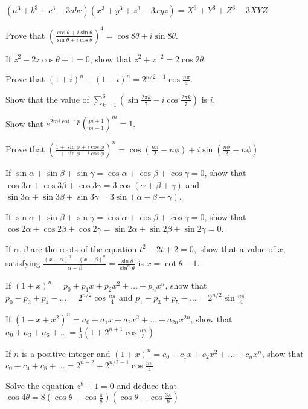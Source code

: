   \item $(a^3 + b^3 + c^3 - 3abc)(x^3 + y^3 + z^3 - 3xyz) = X^3 + Y^3 + Z^3 - 3XYZ$
  \stopitemize
\item Prove that $\left(\frac{\cos\theta + i\sin\theta}{\sin\theta + i\cos\theta}\right)^4 = \cos8\theta + i\sin8\theta$.
\item If $z^2 - 2z\cos\theta + 1 = 0$, show that $z^2 + z^{-2} = 2\cos2\theta$.
\item Prove that $(1 + i)^n + (1 - i)^n = 2^{n/2 + 1}\cos\frac{n\pi}{4}$.
\item Show that the value of $\displaystyle\sum_{k = 1}^6\left(\sin\frac{2\pi k}{7} - i\cos\frac{2\pi
  k}{7}\right)$ is $i$.
\item Show that $e^{2mi\cot^{-1}p}\left(\frac{pi + 1}{pi - 1}\right)^m = 1$.
\item Prove that $\left(\frac{1 + \sin\phi + i\cos\phi}{1 + \sin\phi - i\cos\phi}\right)^n = \cos\left(\frac{n\pi}{2} -
  n\phi\right) + i\sin\left(\frac{n\phi}{2} - n\phi\right)$
\item If $\sin\alpha + \sin\beta + \sin\gamma = \cos\alpha + \cos\beta + \cos\gamma = 0$, show that $\cos3\alpha + \cos3\beta +
  \cos3\gamma = 3\cos(\alpha + \beta + \gamma)$ and $\sin3\alpha + \sin3\beta + \sin3\gamma = 3\sin(\alpha + \beta + \gamma)$.
\item If $\sin\alpha + \sin\beta + \sin\gamma = \cos\alpha + \cos\beta + \cos\gamma = 0$, show that $\cos2\alpha + \cos2\beta +
  \cos2\gamma = \sin2\alpha + \sin2\beta + \sin2\gamma = 0$.
\item If $\alpha, \beta$ are the roots of the equation $t^2 - 2t + 2 = 0,$ show that a value of $x$, satisfying $\frac{(x +
  \alpha)^n - (x + \beta)^n}{\alpha - \beta} = \frac{\sin\theta}{\sin^n\theta}$ is $x = \cot\theta - 1$.
\item If $(1 + x)^n = p_0 + p_1x + p_2x^2 + \ldots + p_nx^n$, show that $p_0 - p_2 + p_4 - \ldots = 2^{n/2}\cos\frac{n\pi}{4}$ and
  $p_1 - p_3 + p_5 - \ldots = 2^{n/2}\sin\frac{n\pi}{4}$
\item If $(1 - x + x^2)^n = a_0 + a_1x + a_2x^2 + \ldots + a_{2n}x^{2n}$, show that $a_0 + a_3 + a_6 + \ldots = \frac{1}{3}\left(1
  + 2^{n + 1}\cos\frac{n\pi}{3}\right)$
\item If $n$ is a positive integer and $(1 + x)^n = c_0 + c_1x + c_2x^2 + \ldots + c_nx^n$, show that $c_0 + c_4 + c_8 + \ldots =
  2^{n - 2} + 2^{n/2 - 1}\cos\frac{n\pi}{4}$
\item Solve the equation $z^8 + 1= 0$ and deduce that $\cos4\theta = 8\left(\cos\theta - \cos\frac{\pi}{8}\right)\left(\cos\theta -
  \cos\frac{3\pi}{8}\right)$

